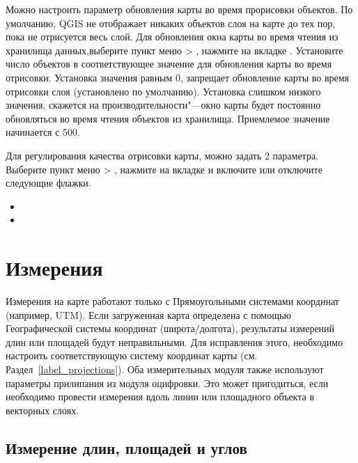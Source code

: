 \label{label_updatemap}

Можно настроить параметр обновления карты во время прорисовки объектов. По умолчанию, QGIS не отображает никаких объектов слоя на карте до тех пор, пока не отрисуется весь слой. Для обновления окна карты во время чтения из хранилища данных,выберите пункт меню  > , нажмите на вкладке . Установите число объектов в соответствующее значение для обновления карты во время отрисовки. Установка значения равным 0, запрещает обновление карты во время отрисовки слоя (установлено по умолчанию). Установка слишком низкого значения,
скажется на производительности"---окно карты будет постоянно обновляться во время чтения объектов из хранилища. Приемлемое значение начинается с 500.

\label{label_renderquality}

Для регулирования качества отрисовки карты, можно задать 2 параметра. Выберите пункт меню  > , нажмите на вкладке  и включите или отключите следующие флажки.

\begin{itemize}
\item {}
\item {}
\end{itemize}

\section{Измерения}\label{sec:measure}

Измерения на карте работают только с Прямоугольными системами координат (например, UTM). Если загруженная карта определена с помощью Географической системы координат (широта/долгота), результаты измерений длин или площадей будут неправильными. Для исправления этого, необходимо настроить соответствующую систему координат карты (см. Раздел~\ref{label_projections}). Оба измерительных модуля также используют параметры прилипания из модуля оцифровки. Это может пригодиться, если необходимо провести измерения вдоль линии или площадного объекта в векторных слоях.

\subsection{Измерение длин, площадей и углов}

